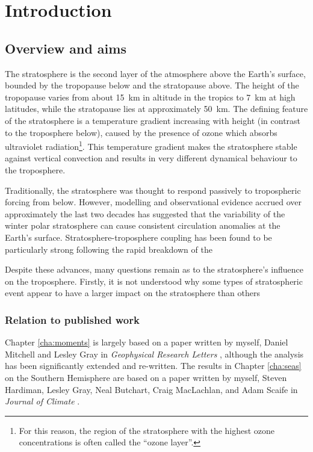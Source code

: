 \chapter{Introduction}
\label{cha:introduction}

\section{Overview and aims}
The stratosphere is the second layer of the atmosphere above the Earth's
surface, bounded by the tropopause below and the stratopause above. The height
of the tropopause varies from about 15~km in altitude in the tropics to 7~km at
high latitudes, while the stratopause lies at approximately 50~km. The defining
feature of the stratosphere is a temperature gradient increasing with height (in
contrast to the troposphere below), caused by the presence of ozone which
absorbs ultraviolet radiation\footnote{For this reason, the region of the
  stratosphere with the highest ozone concentrations is often called the ``ozone
  layer''.}. This temperature gradient makes the stratosphere stable against
vertical convection and results in very different dynamical behaviour to the
troposphere.

Traditionally, the stratosphere was thought to respond passively to tropospheric
forcing from below. However, modelling and observational evidence accrued over
approximately the last two decades has suggested that the variability of the
winter polar stratosphere can cause consistent circulation anomalies at the
Earth's surface. Stratosphere-troposphere coupling has been found to be
particularly strong following the rapid breakdown of the 

Despite these advances, many questions remain as to the
stratosphere's influence on the troposphere. Firstly, it is not understood why
some types of stratospheric event appear to have a larger impact on the
stratosphere than others


\subsection{Relation to published work}
Chapter \ref{cha:moments} is largely based on a paper written by myself, Daniel
Mitchell and Lesley Gray in \emph{Geophysical Research Letters}
\citep{Seviour2013}, although the analysis has been significantly extended and
re-written. The results in Chapter \ref{cha:seas} on the Southern Hemisphere are
based on a paper written by myself, Steven Hardiman, Lesley Gray, Neal Butchart,
Craig MacLachlan, and Adam Scaife in \emph{Journal of Climate}
\citep{Seviour2014}. 

